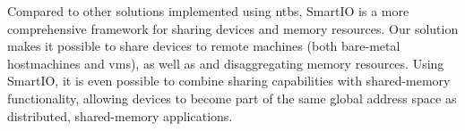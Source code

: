 Compared to other solutions implemented using \glspl{ntb}, SmartIO is a more comprehensive framework for sharing devices and memory resources.
%
Our solution makes it possible to share devices to remote machines (both bare-metal \glspl{hostmachine} and \glspl{vm}), as well as and \gls{disaggregating} memory resources. 
%
%
Using SmartIO, it is even possible to combine sharing capabilities with shared-memory functionality, allowing devices to become part of the same global address space as distributed, shared-memory applications.

